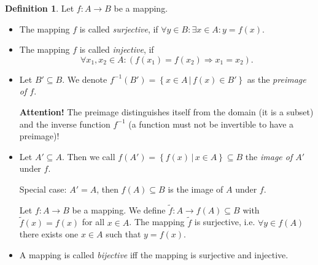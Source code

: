 \documentclass[a4paper,landscape,twocolumn]{article}
\theoremstyle{definition}
\newtheorem{defi}{Definition}
\newcommand\setdef[2]{\left\{#1\,|\,#2\right\}}
\begin{document}
\begin{defi}
  Let $f: A \rightarrow B$ be a mapping.
  \begin{itemize}
    \item
      The mapping $f$ is called \emph{surjective},
      if $\forall y \in B: \exists x \in A: y = f(x)$.
    \item
      The mapping $f$ is called \emph{injective}, if
      \[ \forall x_1, x_2 \in A: (f(x_1) = f(x_2) \Rightarrow x_1 = x_2). \]
    \item
      Let $B' \subseteq B$. We denote $f^{-1}(B') = \setdef{x \in A}{f(x) \in B'}$ as the \emph{preimage of $f$}.

      \textbf{Attention!} The preimage distinguishes itself from the domain (it is a subset)
      and the inverse function $f^{-1}$ (a function must not be invertible to have a preimage)!
    \item
      Let $A' \subseteq A$. Then we call $f(A') = \setdef{f(x)}{x \in A} \subseteq B$ the \emph{image of $A'$} under $f$.

      Special case: $A' = A$, then $f(A) \subseteq B$ is the image of $A$ under $f$.

      Let $f: A \rightarrow B$ be a mapping. We define $\tilde f: A \rightarrow f(A) \subseteq B$ with
      $\tilde f(x) = f(x)$ for all $x \in A$. The mapping $\tilde f$ is surjective, i.e. $\forall y \in f(A)$ there exists one $x \in A$ such that $y = f(x)$.
    \item
      A mapping is called \emph{bijective}
      iff the mapping is surjective and injective.
  \end{itemize}
\end{defi}
\end{document}
